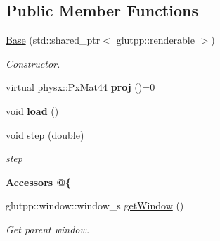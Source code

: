 \subsection*{\-Public \-Member \-Functions}
\begin{DoxyCompactItemize}
\item 
\hypertarget{classglutpp_1_1Camera_1_1Projection_1_1Base_a1682a678dcfd54b0db8de94efcc2d700}{\hyperlink{classglutpp_1_1Camera_1_1Projection_1_1Base_a1682a678dcfd54b0db8de94efcc2d700}{\-Base} (std\-::shared\-\_\-ptr$<$ glutpp\-::renderable $>$)}\label{classglutpp_1_1Camera_1_1Projection_1_1Base_a1682a678dcfd54b0db8de94efcc2d700}

\begin{DoxyCompactList}\small\item\em \-Constructor. \end{DoxyCompactList}\item 
\hypertarget{classglutpp_1_1Camera_1_1Projection_1_1Base_a675ea3d7add2f1f35dfe78efbd830c2d}{virtual physx\-::\-Px\-Mat44 {\bfseries proj} ()=0}\label{classglutpp_1_1Camera_1_1Projection_1_1Base_a675ea3d7add2f1f35dfe78efbd830c2d}

\item 
\hypertarget{classglutpp_1_1Camera_1_1Projection_1_1Base_a4d348ea3fc3134598b02d373a8d081d5}{void {\bfseries load} ()}\label{classglutpp_1_1Camera_1_1Projection_1_1Base_a4d348ea3fc3134598b02d373a8d081d5}

\item 
void \hyperlink{classglutpp_1_1Camera_1_1Projection_1_1Base_ac42d1a82122668c3958c586eea0d88d3}{step} (double)
\begin{DoxyCompactList}\small\item\em step \end{DoxyCompactList}\end{DoxyCompactItemize}
\begin{Indent}{\bf \-Accessors @\{}\par
\begin{DoxyCompactItemize}
\item 
\hypertarget{classglutpp_1_1Camera_1_1Projection_1_1Base_a341df0c373f2c137f37cc9bfab3d00fd}{glutpp\-::window\-::window\-\_\-s \hyperlink{classglutpp_1_1Camera_1_1Projection_1_1Base_a341df0c373f2c137f37cc9bfab3d00fd}{get\-Window} ()}\label{classglutpp_1_1Camera_1_1Projection_1_1Base_a341df0c373f2c137f37cc9bfab3d00fd}

\begin{DoxyCompactList}\small\item\em \-Get parent window. \end{DoxyCompactList}\end{DoxyCompactItemize}
\end{Indent}
